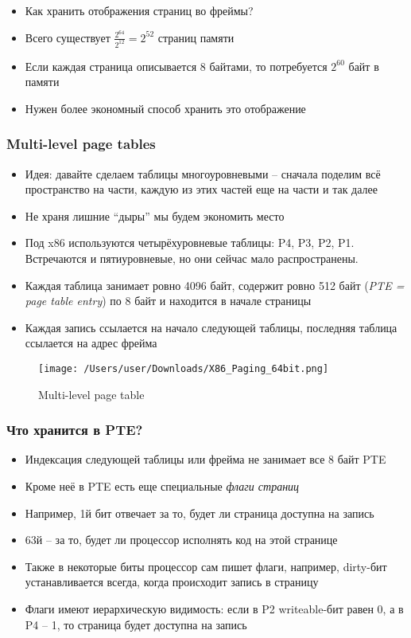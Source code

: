     \begin{itemize}
      \item Как хранить отображения страниц во фреймы?
      \item Всего существует $\frac{2^{64}}{2^{12}} = 2^{52}$ страниц памяти
      \item Если каждая страница описывается 8 байтами, то потребуется $2^{60}$ байт в памяти
      \item Нужен более экономный способ хранить это отображение
    \end{itemize}
  
  \subsubsection{Multi-level page tables}
    \begin{itemize}
      \item Идея: давайте сделаем таблицы многоуровневыми -- сначала поделим всё пространство на части, каждую из этих частей еще на части и так далее
      \item Не храня лишние ``дыры'' мы будем экономить место
      \item Под x86 используются четырёхуровневые таблицы: P4, P3, P2, P1. Встречаются и пятиуровневые, но они сейчас мало распространены.
      \item Каждая таблица занимает ровно 4096 байт, содержит ровно 512 байт (\textit{PTE = page table entry}) по 8 байт и находится в начале страницы
      \item Каждая запись ссылается на начало следующей таблицы, последняя таблица ссылается на адрес фрейма
    \end{itemize}
    
\begin{figure}[H]
\centering
  \texttt{[image: /Users/user/Downloads/X86\_Paging\_64bit.png]}
  \caption{Multi-level page table}
  \label{fig:page_table}
\end{figure}  
  
  \subsubsection{Что хранится в PTE?}
    \begin{itemize}
      \item Индексация следующей таблицы или фрейма не занимает все 8 байт PTE
      \item Кроме неё в PTE есть еще специальные \textit{флаги страниц}
      \item Например, 1й бит отвечает за то, будет ли страница доступна на запись
      \item 63й -- за то, будет ли процессор исполнять код на этой странице
      \item Также в некоторые биты процессор сам пишет флаги, например, dirty-бит устанавливается всегда, когда происходит запись в страницу
      \item Флаги имеют иерархическую видимость: если в P2 writeable-бит равен 0, а в P4 -- 1, то страница будет доступна на запись
    \end{itemize}
  
